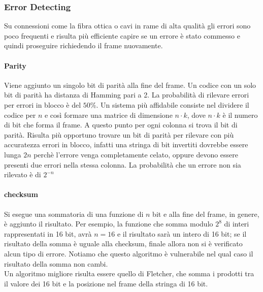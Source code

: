 \documentclass{article}
\begin{document}
\subsubsection{Error Detecting}
Su connessioni come la fibra ottica o cavi in rame di alta qualità gli errori
sono poco frequenti e risulta più efficiente capire se un errore è stato
commesso e quindi proseguire richiedendo il frame nuovamente.

\paragraph{Parity} Viene aggiunto un singolo bit di parità alla fine del frame.
Un codice con un solo bit di parità ha distanza di Hamming pari a 2. La
probabilità di rilevare errori per errori in blocco è del $50$\%. Un sistema più
affidabile consiste nel dividere il codice per $n$ e così formare una matrice di
dimensione $n \cdot k$, dove $n \cdot k$ è il numero di bit che forma il frame.
A questo punto per ogni colonna si trova il bit di parità. Risulta più opportuno
trovare un bit di parità per rilevare con più accuratezza errori in blocco,
infatti una stringa di bit invertiti dovrebbe essere lunga $2n$ perchè l'errore
venga completamente celato, oppure devono essere presenti due errori nella
stessa colonna. La probabilità che un errore non sia rilevato è di $2^{-n}$

\paragraph{checksum}
Si esegue una sommatoria di una funzione di $n$ bit e alla fine del frame, in
genere, è aggiunto il risultato. Per esempio, la funzione che somma modulo
$2^8$ di interi rappresentati in 16 bit, avrà $n = 16$ e il risultato sarà un
intero di 16 bit; se il risultato della somma è uguale alla checksum, finale
allora non si è verificato alcun tipo di errore. Notiamo che questo algoritmo è
vulnerabile nel qual caso il risultato della somma non cambi.\\
Un algoritmo migliore risulta essere quello di Fletcher, che somma i prodotti
tra il valore dei 16 bit e la posizione nel frame della stringa di 16 bit.
\end{document}
